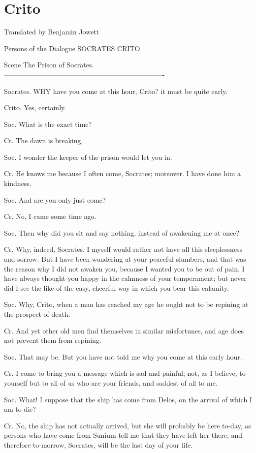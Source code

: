\chapter{Crito} %
\label{cha:crito}



Translated by Benjamin Jowett

Persons of the Dialogue
SOCRATES
CRITO

Scene
The Prison of Socrates.
----------------------------------------------------------------------

Socrates. WHY have you come at this hour, Crito? it must be quite
early. 

Crito. Yes, certainly. 

Soc. What is the exact time? 

Cr. The dawn is breaking. 

Soc. I wonder the keeper of the prison would let you in.

Cr. He knows me because I often come, Socrates; moreover. I have done
him a kindness. 

Soc. And are you only just come? 

Cr. No, I came some time ago. 

Soc. Then why did you sit and say nothing, instead of awakening me
at once? 

Cr. Why, indeed, Socrates, I myself would rather not have all this
sleeplessness and sorrow. But I have been wondering at your peaceful
slumbers, and that was the reason why I did not awaken you, because
I wanted you to be out of pain. I have always thought you happy in
the calmness of your temperament; but never did I see the like of
the easy, cheerful way in which you bear this calamity. 

Soc. Why, Crito, when a man has reached my age he ought not to be
repining at the prospect of death. 

Cr. And yet other old men find themselves in similar misfortunes,
and age does not prevent them from repining. 

Soc. That may be. But you have not told me why you come at this early
hour. 

Cr. I come to bring you a message which is sad and painful; not, as
I believe, to yourself but to all of us who are your friends, and
saddest of all to me. 

Soc. What! I suppose that the ship has come from Delos, on the arrival
of which I am to die? 

Cr. No, the ship has not actually arrived, but she will probably be
here to-day, as persons who have come from Sunium tell me that they
have left her there; and therefore to-morrow, Socrates, will be the
last day of your life. 

